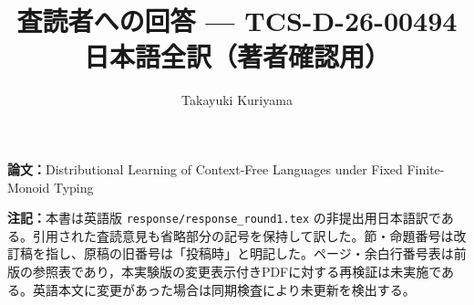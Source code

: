 \documentclass[10pt,a4paper]{ltjsarticle}
\title{査読者への回答 --- TCS-D-26-00494\\\large 日本語全訳（著者確認用）}
\author{Takayuki Kuriyama}
\date{}
\begin{document}
\maketitle
\noindent\textbf{論文：}Distributional Learning of Context-Free Languages under Fixed Finite-Monoid Typing

\noindent\textbf{注記：}本書は英語版 \texttt{response/response\_round1.tex} の非提出用日本語訳である。引用された査読意見も省略部分の記号を保持して訳した。節・命題番号は改訂稿を指し、原稿の旧番号は「投稿時」と明記した。ページ・余白行番号表は前版の参照表であり，本実験版の変更表示付きPDFに対する再検証は未実施である。英語本文に変更があった場合は同期検査により未更新を検出する。







\end{document}
